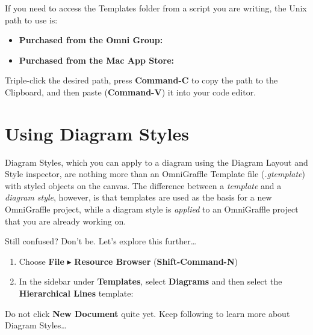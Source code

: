 \documentclass[../main.tex]{subfiles}
\begin{document}
\begin{ogsidebar}
  If you need to access the Templates folder from a script you are writing, the Unix path to use
  is:

  \begin{itemize}
    \item \textbf{Purchased from the Omni Group:}

      \noindent\footnotesize{}
    \item \textbf{Purchased from the Mac App Store:}

      \noindent\footnotesize{}
  \end{itemize}

  Triple-click the desired path, press \textbf{Command-C} to copy the path to the Clipboard, and
  then paste (\textbf{Command-V}) it into your code editor.
\end{ogsidebar}

\section{Using Diagram Styles}

Diagram Styles, which you can apply to a diagram using the Diagram Layout and Style inspector,
are nothing more than an OmniGraffle Template file (\textit{.gtemplate}) with styled objects
on the canvas. The difference between a \textit{template} and a \textit{diagram style},
however, is that templates are used as the basis for a new OmniGraffle project, while a
diagram style is \textit{applied} to an OmniGraffle project that you are already working on.

Still confused? Don't be. Let's explore this further\ldots{}

\begin{enumerate}
  \item Choose \textbf{File} $\blacktriangleright$ \textbf{Resource Browser}
    (\textbf{Shift-Command-N})
  \item In the sidebar under \textbf{Templates}, select \textbf{Diagrams} and then select the
    \textbf{Hierarchical Lines} template:
\end{enumerate}

\begin{ogwarning}
  Do not click \textbf{New Document} quite yet. Keep following to learn more about Diagram
  Styles\ldots{}
\end{ogwarning}
\end{document}
